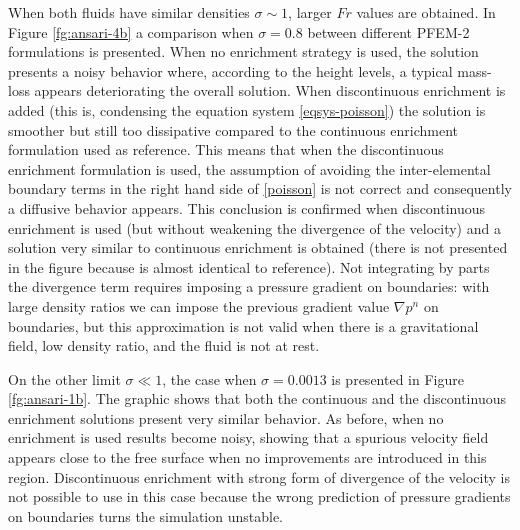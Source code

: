 When both fluids have similar densities $\sigma \sim 1$, larger $Fr$ values are obtained. In Figure \ref{fg:ansari-4b} a comparison when $\sigma=0.8$ between different PFEM-2 formulations is presented. When no enrichment strategy is used, the solution 
presents a noisy behavior where, according to the height levels, a typical mass-loss appears deteriorating the overall solution. When discontinuous enrichment is added (this is, condensing the equation system \ref{eqsys-poisson}) the solution is smoother but still too dissipative compared to the continuous enrichment formulation used as reference. This means that when the discontinuous enrichment formulation is used, the assumption of avoiding the inter-elemental boundary terms in the right hand side of \ref{poisson} is not correct and consequently a diffusive behavior appears. This conclusion is confirmed when discontinuous enrichment is used (but without weakening the divergence of the velocity) and a solution very similar to continuous enrichment is obtained (there is not presented in the figure because is almost identical to reference). Not integrating by parts the divergence term requires imposing a pressure gradient on boundaries: with large density ratios we can impose the previous gradient value $\nabla p^n$ on boundaries, but this approximation is not valid when there is a gravitational field, low density ratio, and the fluid is not at rest.

On the other limit $\sigma \ll 1$, the case when $\sigma=0.0013$ is presented in Figure \ref{fg:ansari-1b}. The graphic shows that both the continuous and the discontinuous enrichment solutions present very similar behavior. As before, when no enrichment is used results become noisy, showing that a spurious velocity field appears close to the free surface when no improvements are introduced in this region. Discontinuous enrichment with strong form of divergence of the velocity is not possible to use in this case because the wrong prediction of pressure gradients on boundaries turns the simulation unstable.

